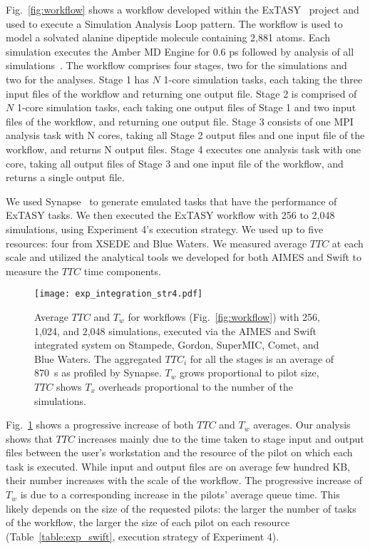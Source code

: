 \documentclass[10pt, conference, compsocconf]{IEEEtran}
\begin{document}
Fig.~\ref{fig:workflow} shows a workflow developed within the
ExTASY~\cite{balasubramanian2016extasy} project and used to execute a
Simulation Analysis Loop pattern. The workflow is used to model a solvated
alanine dipeptide molecule containing 2,881 atoms. Each simulation executes
the Amber MD Engine for 0.6 ps followed by analysis of all
simulations~\cite{balasubramanian2016ensemble}.  The workflow comprises four
stages, two for the simulations and two for the analyses. Stage 1 has
\(N\) 1-core simulation tasks, each taking the three input files of the
workflow and returning one output file. Stage 2 is comprised of \(N\) 1-core
simulation tasks, each taking one output files of Stage 1 and two input files
of the workflow, and returning one output file. Stage 3 consists of one MPI
analysis task with N cores, taking all Stage 2 output files and one input
file of the workflow, and returns N output files. Stage 4 executes one
analysis task with one core, taking all output files of Stage 3 and one input
file of the workflow, and returns a single output file.

We used Synapse~\cite{merzky2016synapse} to generate emulated tasks that have
the performance of ExTASY
tasks.  We then executed the ExTASY workflow with 256 to 2,048 simulations,
using Experiment 4's execution strategy. We used up to five resources: four
from XSEDE and Blue Waters. We measured average \(TTC\) at each scale and
utilized the analytical tools we developed for both AIMES and Swift to
measure the \(TTC\) time components.

\begin{figure}
  \centering
  \texttt{[image: exp\_integration\_str4.pdf]}
  \caption{ Average \(TTC\) and \(T_w\) for workflows
            (Fig.~\ref{fig:workflow}) with 256, 1,024, and 2,048 simulations,
            executed via the AIMES and Swift integrated system on Stampede,
            Gordon, SuperMIC, Comet, and Blue Waters. The aggregated
            \(TTC_i\) for all the stages is an average of 870~s as profiled
            by Synapse. \(T_w\) grows proportional to pilot size, \(TTC\)
            shows \(T_x\) overheads proportional to the number of the
            simulations.}\label{fig:workflow_results}
\end{figure}

Fig.~\ref{fig:workflow_results} shows a progressive increase of both \(TTC\)
and \(T_w\) averages. Our analysis shows that \(TTC\) increases mainly due to
the time taken to stage input and output files between the user's workstation
and the resource of the pilot on which each task is executed. While input and
output files are on average few hundred KB, their number increases with the
scale of the workflow. The progressive increase of \(T_w\) is due to a
corresponding increase in the pilots' average queue time. This likely depends
on the size of the requested pilots: the larger the number of tasks of the
workflow, the larger the size of each pilot on each resource
(Table~\ref{table:exp_swift}, execution strategy of Experiment 4).
\end{document}
